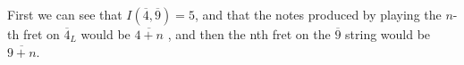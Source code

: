 \documentclass[preview]{standalone}
\begin{document}
\begin{center}
First we can see that $I(\overline{4}, \overline{9}) = 5$, and that the notes produced by playing the $n$-th fret on $\overline{4}_L$ would be $\overline{4 + n}$ , and then the nth fret on the $\overline{9}$ string would be $ \overline{9 + n}$.
\end{center}
\end{document}
